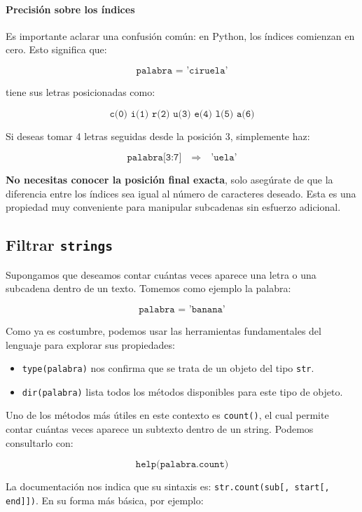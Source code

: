 \documentclass{article}
\theoremstyle{nonumberplain}
\begin{document}
\paragraph{Precisión sobre los índices}

Es importante aclarar una confusión común: en Python, los índices comienzan en cero. Esto significa que:

\[
\texttt{palabra = 'ciruela'}
\]

tiene sus letras posicionadas como:

\[
\texttt{c(0) i(1) r(2) u(3) e(4) l(5) a(6)}
\]

Si deseas tomar 4 letras seguidas desde la posición 3, simplemente haz:

\[
\texttt{palabra[3:7]} \quad \Rightarrow \quad \texttt{'uela'}
\]

\textbf{No necesitas conocer la posición final exacta}, solo asegúrate de que la diferencia entre los índices sea igual al número de caracteres deseado. Esta es una propiedad muy conveniente para manipular subcadenas sin esfuerzo adicional.


\subsection*{Filtrar \texttt{strings}}

Supongamos que deseamos contar cuántas veces aparece una letra o una subcadena dentro de un texto. Tomemos como ejemplo la palabra:

\[
\texttt{palabra = 'banana'}
\]

Como ya es costumbre, podemos usar las herramientas fundamentales del lenguaje para explorar sus propiedades:

\begin{itemize}
    \item \texttt{type(palabra)} nos confirma que se trata de un objeto del tipo \texttt{str}.
    \item \texttt{dir(palabra)} lista todos los métodos disponibles para este tipo de objeto.
\end{itemize}

Uno de los métodos más útiles en este contexto es \texttt{count()}, el cual permite contar cuántas veces aparece un subtexto dentro de un string. Podemos consultarlo con:

\[
\texttt{help(palabra.count)}
\]

La documentación nos indica que su sintaxis es: \texttt{str.count(sub[, start[, end]])}. En su forma más básica, por ejemplo:
\end{document}
